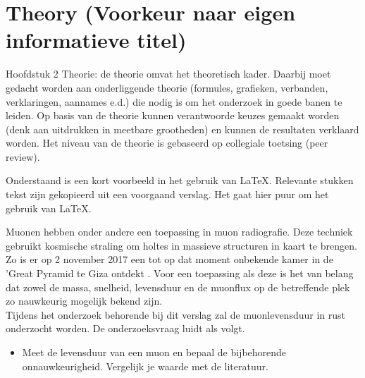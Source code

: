 \chapter{Theory (Voorkeur naar eigen informatieve titel)}

Hoofdstuk 2 Theorie: de theorie omvat het theoretisch kader. Daarbij moet gedacht worden aan onderliggende theorie (formules, grafieken, verbanden, verklaringen, aannames e.d.) die nodig is om het onderzoek in goede banen te leiden. Op basis van de theorie kunnen verantwoorde keuzes gemaakt worden (denk aan uitdrukken in meetbare grootheden) en kunnen de resultaten verklaard worden. Het niveau van de theorie is gebaseerd op collegiale toetsing (peer review).

Onderstaand is een kort voorbeeld in het gebruik van LaTeX. Relevante stukken tekst zijn gekopieerd uit een voorgaand verslag. Het gaat hier puur om het gebruik van LaTeX.

Muonen hebben onder andere een toepassing in muon radiografie. Deze techniek gebruikt kosmische straling om holtes in massieve structuren in kaart te brengen. Zo is er op 2 november 2017 een tot op dat moment onbekende kamer in de 'Great Pyramid te Giza ontdekt \cite{PWS}. Voor een toepassing als deze is het van belang dat zowel de massa, snelheid, levensduur en de muonflux op de betreffende plek zo nauwkeurig mogelijk bekend zijn. \\

Tijdens het onderzoek behorende bij dit verslag zal de muonlevensduur in rust onderzocht worden. De onderzoeksvraag luidt als volgt.
\begin{itemize}
	\item Meet de levensduur van een muon en bepaal de bijbehorende onnauwkeurigheid. Vergelijk je waarde met de literatuur.
\end{itemize}

